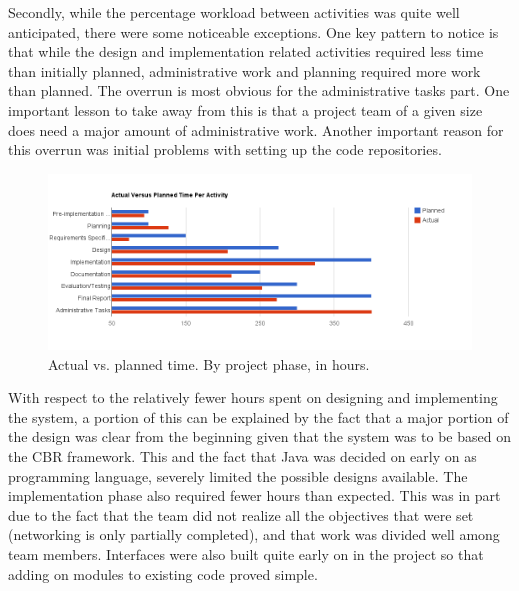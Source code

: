 Secondly, while the percentage workload between activities was quite
well anticipated, there were some noticeable exceptions. One key
pattern to notice is that while the design and implementation related
activities required less time than initially planned, administrative
work and planning required more work than planned. The overrun is most
obvious for the administrative tasks part. One important lesson to
take away from this is that a project team of a given size does need a
major amount of administrative work. Another important reason for this
overrun was initial problems with setting up the code repositories. 

\begin{centering}
  \begin{figure}[h!]
    \includegraphics[width=\textwidth]{Evaluation/time_per_activity}
    \caption{Actual vs. planned time. By project phase, in hours.}
    \label{perActivity}
  \end{figure}
\end{centering}

With respect to the relatively fewer hours spent on designing and
implementing the system, a portion of this can be explained by the
fact that a major portion of the design was clear from the beginning
given that the system was to be based on the CBR framework. This and
the fact that Java was decided on early on as programming language,
severely limited the possible designs available. The implementation
phase also required fewer hours than expected. This was in part due to
the fact that the team did not realize all the objectives that were
set (networking is only partially completed), and that work was divided
well among team members. Interfaces were also built quite early on in
the project so that adding on modules to existing code proved simple. 


